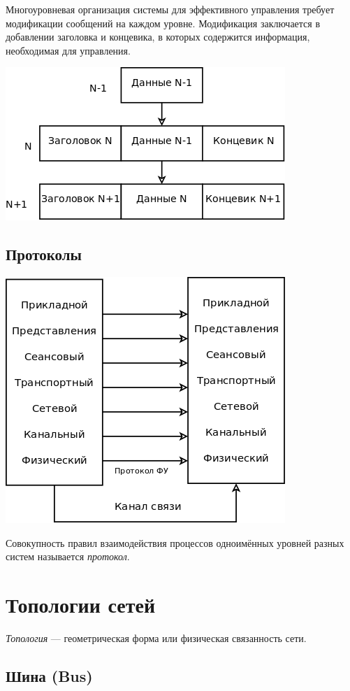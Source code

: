 \documentclass[12pt, russian, oneside, article]{ncc}
\begin{document}
Многоуровневая организация системы для эффективного управления требует модификации сообщений на каждом уровне. Модификация заключается в добавлении заголовка и концевика, в которых содержится информация, необходимая для управления.

\includegraphics[]{images/SiSPI/mess_strucr.png}
\subsection{Протоколы}
\label{sec-1_5}


\includegraphics[]{images/SiSPI/protocol.png}

Совокупность правил взаимодействия процессов одноимённых уровней разных систем называется \emph{протокол}.
\section{Топологии сетей}
\label{sec-2}


\emph{Топология} --- геометрическая форма или физическая связанность сети.
\subsection{Шина (Bus)}
\label{sec-2_1}
\end{document}
